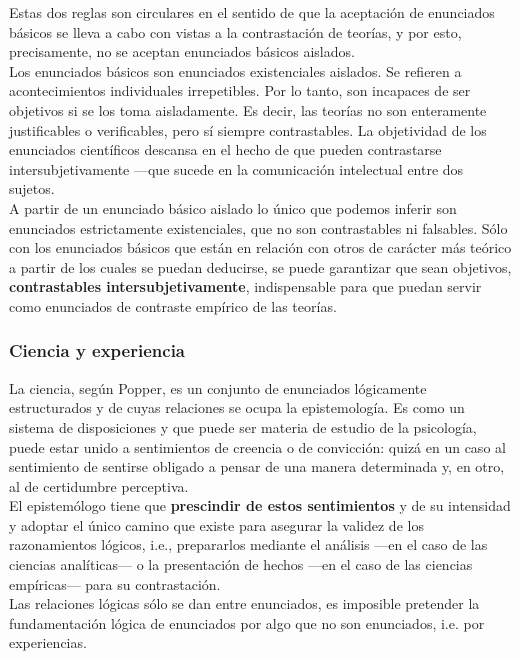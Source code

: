 \documentclass[a4paper, 11pt, twocolumn, spanish]{article}
\begin{document}
Estas dos reglas son circulares en el sentido de que la aceptación de
enunciados básicos se lleva a cabo con vistas a la contrastación de
teorías, y por esto, precisamente, no se aceptan enunciados básicos
aislados.\\[0pt]
Los enunciados básicos son enunciados existenciales aislados. Se
refieren a acontecimientos individuales irrepetibles. Por lo tanto,
son incapaces de ser objetivos si se los toma aisladamente. Es decir,
las teorías no son enteramente justificables o verificables, pero sí
siempre contrastables. La objetividad de los enunciados científicos
descansa en el hecho de que pueden contrastarse intersubjetivamente
—que sucede en la comunicación intelectual entre dos sujetos.\\[0pt]

A partir de un enunciado básico aislado lo único que podemos inferir
son enunciados estrictamente existenciales, que no son contrastables
ni falsables. Sólo con los enunciados básicos que están en relación
con otros de carácter más teórico a partir de los cuales se puedan
deducirse, se puede garantizar que sean objetivos, \textbf{contrastables
intersubjetivamente}, indispensable para que puedan servir como
enunciados de contraste empírico de las teorías.

\subsubsection{Ciencia y experiencia}
\label{sec:orgb59213d}
La ciencia, según Popper, es un conjunto de enunciados lógicamente
estructurados y de cuyas relaciones se ocupa la epistemología. Es como
un sistema de disposiciones y que puede ser materia de estudio de la
psicología, puede estar unido a sentimientos de creencia o de
convicción: quizá en un caso al sentimiento de sentirse obligado a
pensar de una manera determinada y, en otro, al de certidumbre
perceptiva.\\[0pt]
El epistemólogo tiene que \textbf{prescindir de estos sentimientos} y de su
intensidad y adoptar el único camino que existe para asegurar la
validez de los razonamientos lógicos, i.e., prepararlos mediante el
análisis —en el caso de las ciencias analíticas— o la presentación de
hechos —en el caso de las ciencias empíricas— para su contrastación.\\[0pt]
Las relaciones lógicas sólo se dan entre enunciados, es imposible
pretender la fundamentación lógica de enunciados por algo que no son
enunciados, i.e. por experiencias.\\[0pt]
\end{document}
